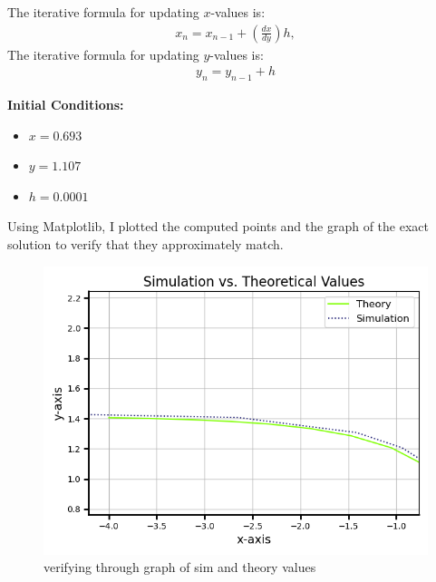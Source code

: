 \documentclass[article]{IEEEtran}
\numberwithin{figure}{enumi}
\begin{document}
\noindent The iterative formula for updating $x$-values is:  
\begin{align}
    x_n = x_{n-1} + \left(\frac{dx}{dy}\right) h,
\end{align}
The iterative formula for updating $y$-values is: 
\begin{align}
    y_n=y_{n-1}+h
\end{align} 

\noindent\textbf{Initial Conditions:}  
\begin{itemize}
    \item $x = 0.693$  
    \item $y = 1.107$  
    \item $h = 0.0001$  
\end{itemize}

Using Matplotlib, I plotted the computed points and the graph of the exact solution to verify that they approximately match.
\begin{figure}[h!]
	\centering
	\includegraphics[width=\columnwidth]{figs/fig1.png}
	\caption{verifying through graph of sim and theory values}
	\label{}
\end{figure}	
\end{document}
